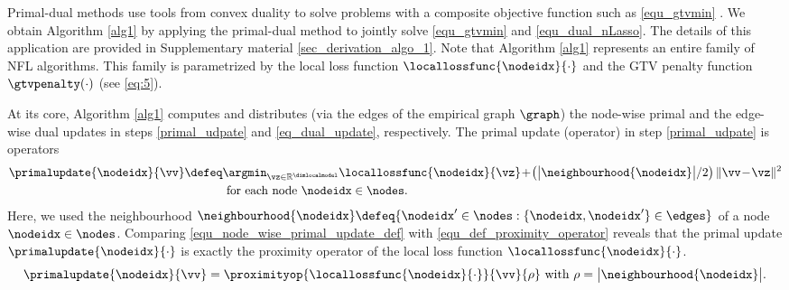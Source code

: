 \documentclass[lettersize,journal]{IEEEtran}
\begin{document}
Primal-dual methods use tools from convex duality to solve problems with a composite objective 
function such as \eqref{equ_gtvmin} \cite{RockafellarBook,pock_chambolle_2016}. %
We obtain Algorithm \ref{alg1} by applying the primal-dual method \cite[Alg. 6]{pock_chambolle_2016} to 
jointly solve \eqref{equ_gtvmin} and \eqref{equ_dual_nLasso}. The details of this application are 
provided in Supplementary material \ref{sec_derivation_algo_1}. Note that Algorithm \ref{alg1} represents an entire 
family of NFL algorithms. This family is parametrized by the local loss function $\locallossfunc{\nodeidx}{\cdot}$ 
and the GTV penalty function $\gtvpenalty(\cdot)$ (see \eqref{eq:5}). 

At its core, Algorithm \ref{alg1} computes and distributes (via the edges of the 
empirical graph $\graph$) the node-wise primal and the edge-wise dual updates in steps \eqref{primal_udpate} 
and \eqref{eq_dual_update}, respectively. The primal update (operator) in step \eqref{primal_udpate} is 
operators
\begin{equation}
\label{equ_node_wise_primal_update_def}
\begin{aligned}
\primalupdate{\nodeidx}{\vv}\defeq & \argmin_{\vz \in \mathbb{R}^{\dimlocalmodel}} \locallossfunc{\nodeidx}{\vz}\!+\!\left( \big|\neighbourhood{\nodeidx}\big|/2 \right) \|\vv\!-\!\vz\|^{2} \\
& \mbox{ for each node } \nodeidx \in \nodes. %
\end{aligned}
\vspace{-2mm}
\end{equation}
Here, we used the neighbourhood $\neighbourhood{\nodeidx} \defeq \{ \nodeidx' \in \nodes: \{\nodeidx,\nodeidx'\} \in \edges\}$ 
of a node $\nodeidx \in \nodes$. Comparing \eqref{equ_node_wise_primal_update_def} with \eqref{equ_def_proximity_operator} 
reveals that the primal update $\primalupdate{\nodeidx}{\cdot}$ is exactly the proximity 
operator of the local loss function $\locallossfunc{\nodeidx}{\cdot}$. 
$$\primalupdate{\nodeidx}{\vv} = \proximityop{\locallossfunc{\nodeidx}{\cdot}}{\vv}{\rho} \mbox{ with }\rho=\big|\neighbourhood{\nodeidx}\big|. \vspace{-2mm}$$
\end{document}
